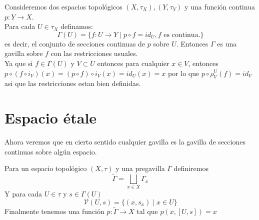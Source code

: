 \documentclass[14pt]{extarticle}
\begin{document}
\begin{ejemplo}{}{}
    Consideremos dos espacios topológicos
    $(X,\tau_X),(Y, \tau_Y)$ y una función 
    continua $p:Y\rightarrow X$.\\
    Para cada $U \in \tau_X$ definamos:
    $$\Gamma(U)=\{f:U\rightarrow Y \mid p\circ f= id_{U}, f \mbox{ es continua.} \}$$
    es decir, el conjunto de secciones continuas de $p$
    sobre $U$. Entonces $\Gamma$ es una gavilla sobre $f$
    con las restricciones usuales.\\
    Ya que si $f\in \Gamma(U)$ y $V\subset U$
    entonces para cualquier $x\in V$, entonces
    $p\circ(f\circ i_V)(x)=(p\circ f)\circ i_V(x)
    =id_U(x)=x$ por lo que $p\circ \rho_{V}^{U}(f) = id_V$
    asi que las restricciones estan bien definidas.
\end{ejemplo}

\section{Espacio étale}
Ahora veremos que en cierto sentido cualquier
gavilla es la gavilla de secciones continuas
sobre algún espacio.

\begin{definicion}{}{}
    Para un espacio topológico $(X,\tau)$
    y una pregavilla $\Gamma$ definiremos 
    $$\widetilde{\Gamma}=\bigsqcup_{x\in X}\Gamma_x$$
    Y para cada $U\in \tau$ y $s\in \Gamma(U)$
    $$\mathcal{V}(U,s)=\{(x, s_x)\mid x\in U\}$$
    Finalmente tenemos una función $p:\widetilde{\Gamma}\rightarrow X$
    tal que $p(x,[U,s])=x$
\end{definicion}
\end{document}
